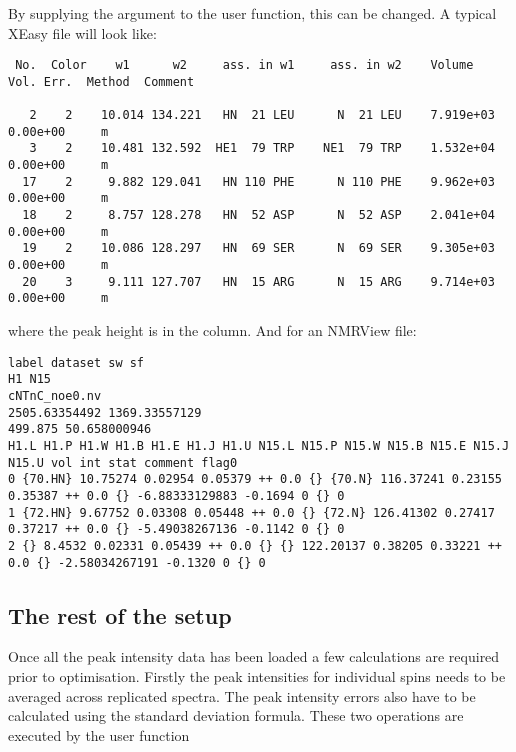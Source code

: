 By supplying the  argument to the  user function, this can be changed.  A typical XEasy file will look like:

{\scriptsize \begin{verbatim}
 No.  Color    w1      w2     ass. in w1     ass. in w2    Volume     Vol. Err.  Method  Comment

   2    2    10.014 134.221   HN  21 LEU      N  21 LEU    7.919e+03  0.00e+00     m
   3    2    10.481 132.592  HE1  79 TRP    NE1  79 TRP    1.532e+04  0.00e+00     m
  17    2     9.882 129.041   HN 110 PHE      N 110 PHE    9.962e+03  0.00e+00     m
  18    2     8.757 128.278   HN  52 ASP      N  52 ASP    2.041e+04  0.00e+00     m
  19    2    10.086 128.297   HN  69 SER      N  69 SER    9.305e+03  0.00e+00     m
  20    3     9.111 127.707   HN  15 ARG      N  15 ARG    9.714e+03  0.00e+00     m
\end{verbatim}}

where the peak height is in the  column.  And for an NMRView file:

{\tiny \begin{verbatim}
label dataset sw sf
H1 N15
cNTnC_noe0.nv
2505.63354492 1369.33557129
499.875 50.658000946
H1.L H1.P H1.W H1.B H1.E H1.J H1.U N15.L N15.P N15.W N15.B N15.E N15.J N15.U vol int stat comment flag0
0 {70.HN} 10.75274 0.02954 0.05379 ++ 0.0 {} {70.N} 116.37241 0.23155 0.35387 ++ 0.0 {} -6.88333129883 -0.1694 0 {} 0
1 {72.HN} 9.67752 0.03308 0.05448 ++ 0.0 {} {72.N} 126.41302 0.27417 0.37217 ++ 0.0 {} -5.49038267136 -0.1142 0 {} 0
2 {} 8.4532 0.02331 0.05439 ++ 0.0 {} {} 122.20137 0.38205 0.33221 ++ 0.0 {} -2.58034267191 -0.1320 0 {} 0
\end{verbatim}}



\subsection{The rest of the setup} \label{sect: Rx setup fin}

Once all the peak intensity data has been loaded a few calculations are required prior to optimisation.  Firstly the peak intensities for individual spins needs to be averaged across replicated spectra.  The peak intensity errors also have to be calculated using the standard deviation formula.  These two operations are executed by the user function


